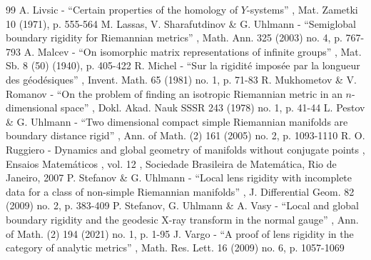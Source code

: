 \begin{thebibliography}{99}
 A. Livsic - “Certain properties of the homology of $Y$-systems” , Mat. Zametki 10 (1971), p. 555-564
 M. Lassas, V. Sharafutdinov \& G. Uhlmann - “Semiglobal boundary rigidity for Riemannian metrics” , Math. Ann. 325 (2003) no. 4, p. 767-793
 A. Malcev - “On isomorphic matrix representations of infinite groups” , Mat. Sb. 8 (50) (1940), p. 405-422
 R. Michel - “Sur la rigidité imposée par la longueur des géodésiques” , Invent. Math. 65 (1981) no. 1, p. 71-83
 R. Mukhometov \& V. Romanov - “On the problem of finding an isotropic Riemannian metric in an $n$-dimensional space” , Dokl. Akad. Nauk SSSR 243 (1978) no. 1, p. 41-44
 L. Pestov \& G. Uhlmann - “Two dimensional compact simple Riemannian manifolds are boundary distance rigid” , Ann. of Math. (2) 161 (2005) no. 2, p. 1093-1110
 R. O. Ruggiero - Dynamics and global geometry of manifolds without conjugate points , Ensaios Matemáticos , vol. 12 , Sociedade Brasileira de Matemática, Rio de Janeiro, 2007
 P. Stefanov \& G. Uhlmann - “Local lens rigidity with incomplete data for a class of non-simple Riemannian manifolds” , J. Differential Geom. 82 (2009) no. 2, p. 383-409
 P. Stefanov, G. Uhlmann \& A. Vasy - “Local and global boundary rigidity and the geodesic X-ray transform in the normal gauge” , Ann. of Math. (2) 194 (2021) no. 1, p. 1-95
 J. Vargo - “A proof of lens rigidity in the category of analytic metrics” , Math. Res. Lett. 16 (2009) no. 6, p. 1057-1069
\end{thebibliography}
